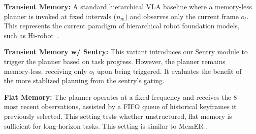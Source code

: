     


\textbf{Transient Memory:} 
    A standard hierarchical VLA baseline where a memory-less planner is invoked at fixed intervals ($n_m$) and observes only the current frame $o_t$. This represents the current paradigm of hierarchical robot foundation models, such as Hi-robot~\cite{Shi2025HiRO}.
    
\textbf{Transient Memory w/ Sentry:} 
    This variant introduces our Sentry module to trigger the planner based on task progress. However, the planner remains memory-less, receiving only $o_t$ upon being triggered. It evaluates the benefit of the more stablized planning from the sentry's gating.
    
\textbf{Flat Memory:} 
    The planner operates at a fixed frequency and receives the 8 most recent observations, assisted by a FIFO queue of historical keyframes it previously selected. This setting tests whether unstructured, flat memory is sufficient for long-horizon tasks. This setting is similar to MemER \cite{Sridhar2025MemERSU}.
    
